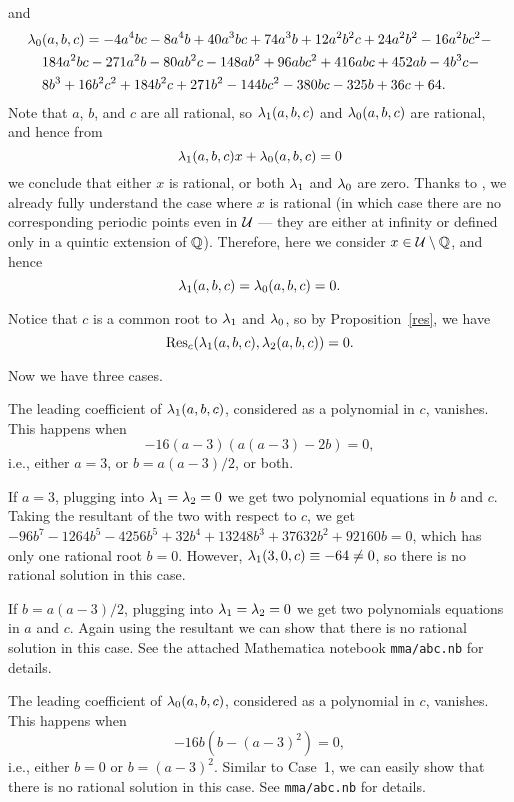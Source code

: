 and
\[
\begin{aligned}
  \lambda_0&(a, b, c) = - 4a^4bc - 8a^4b + 40a^3bc + 74a^3b + 12a^2b^2c +
  24a^2b^2 - 16a^2bc^2 - \\
  & 184a^2bc - 271a^2b - 80ab^2c - 148ab^2 + 96abc^2 +
  416abc + 452ab - 4b^3c - \\
  & 8b^3 + 16b^2c^2 + 184b^2c + 271b^2 - 144bc^2 - 380bc -
  325b + 36c + 64.
\end{aligned}
\]
Note that $a$, $b$, and $c$ are all rational, so $\lambda_1(a, b, c)$ and
$\lambda_0(a, b, c)$ are rational, and hence from
\[
\lambda_1(a, b, c) x + \lambda_0(a, b, c) = 0
\]
we conclude that either $x$ is rational, or both $\lambda_1$ and $\lambda_0$ are
zero. Thanks to \cite{MR1480542}, we already fully understand the case
where $x$ is rational (in which case there are no corresponding
periodic points even in $\mathcal{U}$ --- they are either at infinity or
defined only in a quintic extension of $\mathbb{Q}$). Therefore, here we
consider $x \in \mathcal{U} \setminus \mathbb{Q}$, and hence
\[
\lambda_1(a, b, c) = \lambda_0(a, b, c) = 0.
\]

Notice that $c$ is a common root to $\lambda_1$ and $\lambda_0$, so by
Proposition~\ref{res}, we have
\[
\mathrm{Res}_c(\lambda_1(a, b, c), \lambda_2(a, b, c)) = 0.
\]

Now we have three cases.

\begin{case}
  The leading coefficient of $\lambda_1(a, b, c)$, considered as a
  polynomial in $c$, vanishes. This happens when
  \[
  -16(a - 3)(a(a-3) - 2b) = 0,
  \]
  i.e., either $a = 3$, or $b = a(a-3)/2$, or both.

  If $a = 3$, plugging into $\lambda_1 = \lambda_2 = 0$ we get two polynomial
  equations in $b$ and $c$. Taking the resultant of the two with
  respect to $c$, we get $- 96b^7 - 1264b^5 - 4256b^5 + 32b^4 +
  13248b^3 + 37632b^2 + 92160b = 0$, which has only one rational root
  $b = 0$. However, $\lambda_1(3, 0, c) \equiv -64 \ne 0$, so there is no
  rational solution in this case.

  If $b = a(a-3)/2$, plugging into $\lambda_1 = \lambda_2 = 0$ we get two
  polynomials equations in $a$ and $c$. Again using the resultant we
  can show that there is no rational solution in this case. See the
  attached Mathematica notebook \texttt{mma/abc.nb} for details.
\end{case}

\begin{case}
  The leading coefficient of $\lambda_0(a, b, c)$, considered as a
  polynomial in $c$, vanishes. This happens when
  \[
  -16b(b - (a-3)^2) = 0,
  \]
  i.e., either $b = 0$ or $b = (a - 3)^2$. Similar to Case~1, we can
  easily show that there is no rational solution in this case. See
  \texttt{mma/abc.nb} for details.
\end{case}

